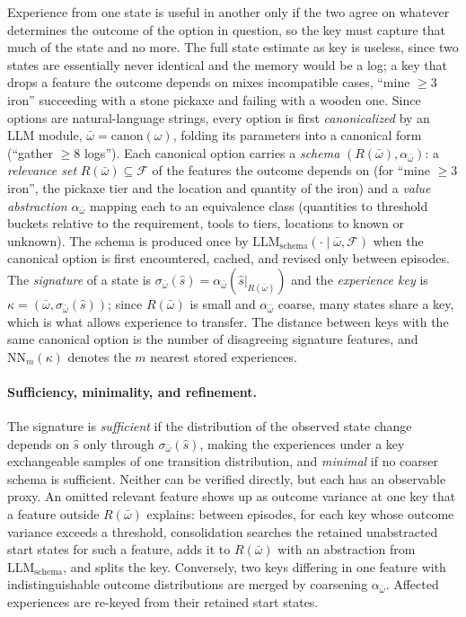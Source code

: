 \documentclass[10pt]{article}
\newcommand{\llm}[1]{\mathrm{LLM}_{\mathrm{#1}}}
\newcommand{\calF}{\mathcal{F}}
\newcommand{\Rel}{R}
\newcommand{\shat}{\hat{s}}
\begin{document}
Experience from one state is useful in another only if the two agree on whatever determines the outcome of the option in question, so the key must capture that much of the state and no more. The full state estimate as key is useless, since two states are essentially never identical and the memory would be a log; a key that drops a feature the outcome depends on mixes incompatible cases, ``mine $\ge3$ iron'' succeeding with a stone pickaxe and failing with a wooden one. Since options are natural-language strings, every option is first \emph{canonicalized} by an LLM module, $\bar\omega=\mathrm{canon}(\omega)$, folding its parameters into a canonical form (``gather $\ge 8$ logs''). Each canonical option carries a \emph{schema} $(\Rel(\bar\omega),\alpha_{\bar\omega})$: a \emph{relevance set} $\Rel(\bar\omega)\subseteq\calF$ of the features the outcome depends on (for ``mine $\ge3$ iron'', the pickaxe tier and the location and quantity of the iron) and a \emph{value abstraction} $\alpha_{\bar\omega}$ mapping each to an equivalence class (quantities to threshold buckets relative to the requirement, tools to tiers, locations to known or unknown). The schema is produced once by $\llm{schema}(\cdot\mid\bar\omega,\calF)$ when the canonical option is first encountered, cached, and revised only between episodes. The \emph{signature} of a state is $\sigma_{\bar\omega}(\shat)=\alpha_{\bar\omega}(\shat|_{\Rel(\bar\omega)})$ and the \emph{experience key} is $\kappa=(\bar\omega,\sigma_{\bar\omega}(\shat))$; since $\Rel(\bar\omega)$ is small and $\alpha_{\bar\omega}$ coarse, many states share a key, which is what allows experience to transfer. The distance between keys with the same canonical option is the number of disagreeing signature features, and $\mathrm{NN}_m(\kappa)$ denotes the $m$ nearest stored experiences.

\paragraph{Sufficiency, minimality, and refinement.}
The signature is \emph{sufficient} if the distribution of the observed state change depends on $\shat$ only through $\sigma_{\bar\omega}(\shat)$, making the experiences under a key exchangeable samples of one transition distribution, and \emph{minimal} if no coarser schema is sufficient. Neither can be verified directly, but each has an observable proxy. An omitted relevant feature shows up as outcome variance at one key that a feature outside $\Rel(\bar\omega)$ explains: between episodes, for each key whose outcome variance exceeds a threshold, consolidation searches the retained unabstracted start states for such a feature, adds it to $\Rel(\bar\omega)$ with an abstraction from $\llm{schema}$, and splits the key. Conversely, two keys differing in one feature with indistinguishable outcome distributions are merged by coarsening $\alpha_{\bar\omega}$. Affected experiences are re-keyed from their retained start states.
\end{document}
